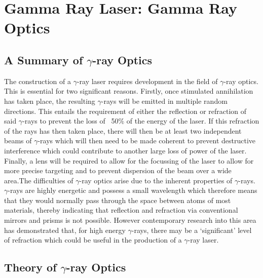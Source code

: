
\chapter{Gamma Ray Laser: Gamma Ray Optics} %

\label{Chapter4} %


\section{A Summary of $\gamma$-ray Optics}

The construction of a $\gamma$-ray laser requires development in the field of  $\gamma$-ray optics. This is essential for two significant reasons. Firstly, once stimulated annihilation has taken place, the resulting $\gamma$-rays will be emitted in multiple random directions. This entails the requirement of either the reflection or refraction of said $\gamma$-rays to prevent the loss of  ~50$\%$ of the energy of the laser. If this refraction of the rays has then taken place, there will then be at least two independent beams of $\gamma$-rays which will then need to be made coherent to prevent destructive interference which could contribute to another large loss of power of the laser. Finally, a lens will be required to allow for the focussing of the laser to allow for more precise targeting and to prevent dispersion of the beam over a wide area.The difficulties of $\gamma$-ray optics arise due to the inherent properties of $\gamma$-rays. $\gamma$-rays are highly energetic and possess a small wavelength which therefore means that they would normally pass through the space between atoms of most materials, thereby indicating that reflection and refraction via conventional mirrors and prisms is not possible. However contemporary research into this area has demonstrated that, for high energy $\gamma$-rays, there may be a ‘significant’ level of refraction which could be useful in the production of a $\gamma$-ray laser. 

\section{Theory of $\gamma$-ray Optics}

